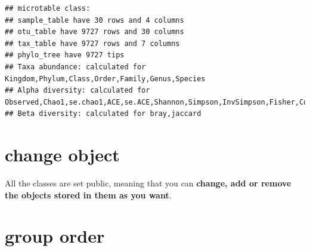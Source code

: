 \documentclass[
]{book}
\newenvironment{Shaded}{\begin{snugshade}}{\end{snugshade}}
\newcommand{\AttributeTok}[1]{\textcolor[rgb]{0.77,0.63,0.00}{#1}}
\newcommand{\CommentTok}[1]{\textcolor[rgb]{0.56,0.35,0.01}{\textit{#1}}}
\newcommand{\DecValTok}[1]{\textcolor[rgb]{0.00,0.00,0.81}{#1}}
\newcommand{\FunctionTok}[1]{\textcolor[rgb]{0.00,0.00,0.00}{#1}}
\newcommand{\NormalTok}[1]{#1}
\newcommand{\OtherTok}[1]{\textcolor[rgb]{0.56,0.35,0.01}{#1}}
\newcommand{\SpecialCharTok}[1]{\textcolor[rgb]{0.00,0.00,0.00}{#1}}
\newcommand{\StringTok}[1]{\textcolor[rgb]{0.31,0.60,0.02}{#1}}
\begin{document}
\begin{verbatim}
## microtable class:
## sample_table have 30 rows and 4 columns
## otu_table have 9727 rows and 30 columns
## tax_table have 9727 rows and 7 columns
## phylo_tree have 9727 tips
## Taxa abundance: calculated for Kingdom,Phylum,Class,Order,Family,Genus,Species 
## Alpha diversity: calculated for Observed,Chao1,se.chao1,ACE,se.ACE,Shannon,Simpson,InvSimpson,Fisher,Coverage 
## Beta diversity: calculated for bray,jaccard
\end{verbatim}

\begin{Shaded}
\end{Shaded}

\hypertarget{change-object}{%
\section{change object}\label{change-object}}

All the classes are set public, meaning that you can \textbf{change, add or remove the objects stored in them as you want}.

\begin{Shaded}
\end{Shaded}

\hypertarget{group-order}{%
\section{group order}\label{group-order}}
\end{document}
